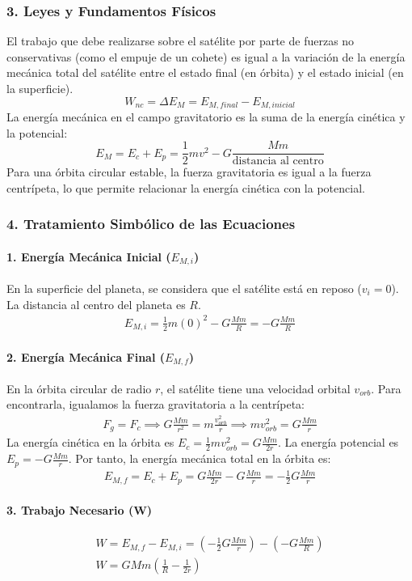 \subsubsection*{3. Leyes y Fundamentos Físicos}
El trabajo que debe realizarse sobre el satélite por parte de fuerzas no conservativas (como el empuje de un cohete) es igual a la variación de la energía mecánica total del satélite entre el estado final (en órbita) y el estado inicial (en la superficie).
$$ W_{nc} = \Delta E_M = E_{M, final} - E_{M, inicial} $$
La energía mecánica en el campo gravitatorio es la suma de la energía cinética y la potencial:
$$ E_M = E_c + E_p = \frac{1}{2}mv^2 - G\frac{Mm}{\text{distancia al centro}} $$
Para una órbita circular estable, la fuerza gravitatoria es igual a la fuerza centrípeta, lo que permite relacionar la energía cinética con la potencial.

\subsubsection*{4. Tratamiento Simbólico de las Ecuaciones}
\paragraph{1. Energía Mecánica Inicial ($E_{M,i}$)}
En la superficie del planeta, se considera que el satélite está en reposo ($v_i=0$). La distancia al centro del planeta es $R$.
\begin{gather}
    E_{M,i} = \frac{1}{2}m(0)^2 - G\frac{Mm}{R} = -G\frac{Mm}{R}
\end{gather}
\paragraph{2. Energía Mecánica Final ($E_{M,f}$)}
En la órbita circular de radio $r$, el satélite tiene una velocidad orbital $v_{orb}$. Para encontrarla, igualamos la fuerza gravitatoria a la centrípeta:
\begin{gather}
    F_g = F_c \implies G\frac{Mm}{r^2} = m\frac{v_{orb}^2}{r} \implies mv_{orb}^2 = G\frac{Mm}{r}
\end{gather}
La energía cinética en la órbita es $E_c = \frac{1}{2}mv_{orb}^2 = G\frac{Mm}{2r}$. La energía potencial es $E_p = -G\frac{Mm}{r}$. Por tanto, la energía mecánica total en la órbita es:
\begin{gather}
    E_{M,f} = E_c + E_p = G\frac{Mm}{2r} - G\frac{Mm}{r} = -\frac{1}{2}G\frac{Mm}{r}
\end{gather}
\paragraph{3. Trabajo Necesario (W)}
\begin{gather}
    W = E_{M,f} - E_{M,i} = \left(-\frac{1}{2}G\frac{Mm}{r}\right) - \left(-G\frac{Mm}{R}\right) \nonumber \\
    W = GMm \left(\frac{1}{R} - \frac{1}{2r}\right)
\end{gather}

